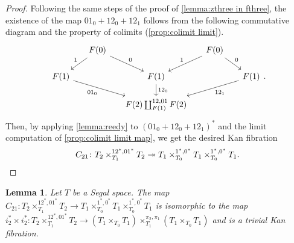\documentclass[11pt, a4paper]{amsart}
\newtheorem{lemma}[equation]{Lemma}
\theoremstyle{definition}
\theoremstyle{remark}
\numberwithin{equation}{section}
\begin{document}
\begin{proof}
  Following the same steps of the proof of \cref{lemma:zthree in fthree}, the existence of the map $01_0 + 12_0 + 12_1$ follows from the following commutative diagram and the property of colimits (\cref{prop:colimit limit}).
  \[ 
  \begin{tikzcd}[row sep=0.5cm, column sep=0.5cm]
    & F(0) \arrow[dl, "1"'] \arrow[dr, "0"]& & F(0) \arrow[dl, "1"'] \arrow[dr, "0"]& \\
   F(1) \arrow[drr, "01_0"'] & & F(1) \arrow[d, "12_0"] & & F(1) \arrow[dll, "12_1"]\\
   & & F(2) \coprod_{F(1)}^{12,01} F(2) & & 
  \end{tikzcd}.
  \]
  Then, by applying \cref{lemma:reedy} to $(01_0 + 12_0 + 12_1)^*$ and the limit computation of \cref{prop:colimit limit map}, we get the desired Kan fibration 
  \[C_{21}\colon T_2 \times^{12^*,01^*}_{T_1} T_2 \twoheadrightarrow T_1 \times^{1^*,0^*}_{T_0} T_1 \times^{1^*,0^*}_{T_0} T_1. \qedhere\]
\end{proof}

\begin{lemma} \label{lemma:ptwoone equivalence}
 Let $T$ be a Segal space. The map $C_{21}\colon T_2 \times^{12^*,01^*}_{T_1} T_2 \to T_1 \times^{1^*,0^*}_{T_0} T_1 \times^{1^*,0^*}_{T_0} T_1$ is isomorphic to the map $i_2^* \times i_2^* \colon T_2 \times^{12^*,01^*}_{T_1} T_2 \to (T_1 \times_{T_0} T_1) \times^{\pi_2,\pi_1}_{T_1}  (T_1 \times_{T_0} T_1)$ and is a trivial Kan fibration.
\end{lemma}
\end{document}

